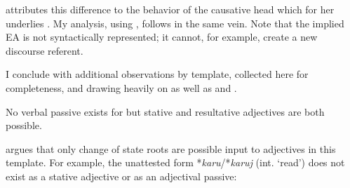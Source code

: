 \begin{exe}
\begin{xlist}
\begin{exe}
\begin{xlist}
\begin{exe}
\begin{exe}
\begin{xlist}
\begin{exe}
\begin{exe}
\begin{xlist}
\begin{exe}
\begin{xlist}
\begin{exe}
\begin{xlist}
\begin{exe}
\begin{xlist}
\begin{exe}
\begin{xlist}
\begin{xlist}
\begin{exe}
\begin{xlist}
\begin{exe}
\begin{xlist}
\begin{exe}
\begin{exe}
\begin{exe}
\begin{xlist}
\begin{exe}
\begin{exe}
\begin{xlist}
\begin{exe}
\begin{xlist}
\begin{exe}
\begin{xlist}
\begin{exe}
\begin{xlist}
\begin{xlist}
\begin{exe}
\begin{xlist}
\begin{exe}
\begin{xlist}
\begin{exe}
\begin{xlist}
\begin{exe}
\begin{xlist}
\begin{exe}
\begin{exe}
\begin{exe}
\begin{exe}
\begin{exe}
\begin{xlist}
\begin{xlist}
\begin{exe}
\begin{xlist}
\begin{exe}
\begin{xlist}
\cite{doron14adj} attributes this difference to the behavior of the causative head  which for her underlies {\thif}. My analysis, using {\vd}, follows in the same vein. Note that the implied EA is not syntactically represented; it cannot, for example, create a new discourse referent.
 \begin{exe}
 \z 

I conclude with additional observations by template, collected here for completeness, and drawing heavily on \cite{doron00} as well as \cite{doron14adj} and \cite{meltzerasscher11}.


No verbal passive exists for {\tkal} but stative and resultative adjectives are both possible.

\cite{doron00} argues that only change of state roots are possible input to adjectives in this template. For example, the unattested form *\emph{karu}/*\emph{karuj} (int. `read') does not exist as a stative adjective or as an adjectival passive:
 \begin{exe}
  

\end{exe}
\end{exe}
\end{xlist}
\end{exe}
\end{xlist}
\end{exe}
\end{xlist}
\end{xlist}
\end{exe}
\end{exe}
\end{exe}
\end{exe}
\end{exe}
\end{xlist}
\end{exe}
\end{xlist}
\end{exe}
\end{xlist}
\end{exe}
\end{xlist}
\end{exe}
\end{xlist}
\end{xlist}
\end{exe}
\end{xlist}
\end{exe}
\end{xlist}
\end{exe}
\end{xlist}
\end{exe}
\end{exe}
\end{xlist}
\end{exe}
\end{exe}
\end{exe}
\end{xlist}
\end{exe}
\end{xlist}
\end{exe}
\end{xlist}
\end{xlist}
\end{exe}
\end{xlist}
\end{exe}
\end{xlist}
\end{exe}
\end{xlist}
\end{exe}
\end{xlist}
\end{exe}
\end{exe}
\end{xlist}
\end{exe}
\end{exe}
\end{xlist}
\end{exe}
\end{xlist}
\end{exe}
